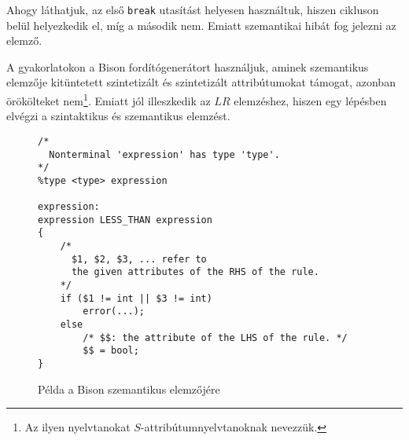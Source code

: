 Ahogy láthatjuk, az első \texttt{break} utasítást helyesen használtuk, hiszen cikluson belül helyezkedik el, míg a második nem. Emiatt szemantikai hibát fog jelezni az elemző.

\newpage

A gyakorlatokon a Bison fordítógenerátort használjuk, aminek szemantikus elemzője kitüntetett szintetizált és szintetizált attribútumokat támogat, azonban örökölteket nem\footnote{Az ilyen nyelvtanokat $S$-attribútumnyelvtanoknak nevezzük.}. Emiatt jól illeszkedik az $LR$ elemzéshez, hiszen egy lépésben elvégzi a szintaktikus és szemantikus elemzést.

\begin{figure}
\begin{lstlisting}[style=cppstyle]
/*
  Nonterminal 'expression' has type 'type'.
*/
%type <type> expression

expression:
expression LESS_THAN expression
{
	/* 
	  $1, $2, $3, ... refer to 
	  the given attributes of the RHS of the rule. 
	*/
	if ($1 != int || $3 != int)
		error(...);
	else
		/* $$: the attribute of the LHS of the rule. */
		$$ = bool;
}
\end{lstlisting}
\caption{Példa a Bison szemantikus elemzőjére}
\end{figure}